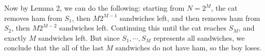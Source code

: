 \documentclass[11pt,a4paper]{article}
\begin{document}
\begin{enumerate}
	Now by Lemma 2, we can do the following: starting from $N=2^M$, 
	the cat removes ham from $S_1$, then $M2^{M-1}$ sandwiches left, 
	and then removes ham from $S_2$, then $M2^{M-2}$ sandwiches left. 
	Continuing this until the cat reaches $S_M$, and exactly $M$ sandwiches left. 
	But since $S_1, \cdots, S_M$ represents all sandwiches, 
	we conclude that the all of the last $M$ sandwiches do not have ham, so the boy loses. 
\end{enumerate}
\end{document}

